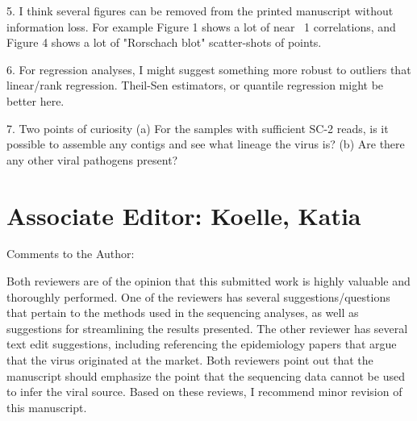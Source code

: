 \documentclass[11pt, oneside]{article}   	%
\begin{document}
5. I think several figures can be removed from the printed manuscript without information loss. For example Figure 1 shows a lot of near ~1 correlations, and Figure 4 shows a lot of "Rorschach blot" scatter-shots of points.

6. For regression analyses, I might suggest something more robust to outliers that linear/rank regression. Theil-Sen estimators, or quantile regression might be better here.

7. Two points of curiosity
   (a) For the samples with sufficient SC-2 reads, is it possible to assemble any contigs and see what lineage the virus is?
   (b) Are there any other viral pathogens present?


\section*{Associate Editor: Koelle, Katia}

Comments to the Author:

Both reviewers are of the opinion that this submitted work is highly valuable and thoroughly performed. One of the reviewers has several suggestions/questions that pertain to the methods used in the sequencing analyses, as well as suggestions for streamlining the results presented. The other reviewer has several text edit suggestions, including referencing the epidemiology papers that argue that the virus originated at the market. Both reviewers point out that the manuscript should emphasize the point that the sequencing data cannot be used to infer the viral source. Based on these reviews, I recommend minor revision of this manuscript.

\color{black}

{\small

}
\end{document}
